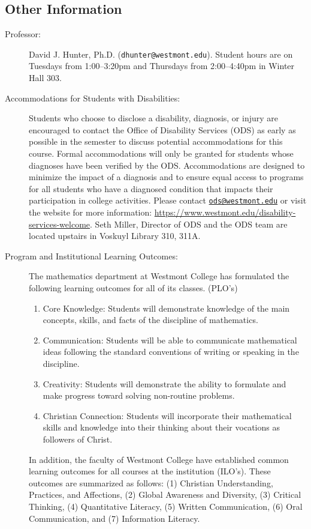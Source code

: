 \documentclass[
  twoside]{article}
\begin{document}
\hypertarget{other-information}{%
\subsection{Other Information}\label{other-information}}

\begin{description} 

\item[Professor:] David J. Hunter, Ph.D.
  (\verb!dhunter@westmont.edu!). Student hours are on Tuesdays from 1:00--3:20pm and Thursdays from 2:00--4:40pm in Winter Hall 303.

\item[Accommodations for Students with Disabilities:] Students who choose to disclose a disability, diagnosis, or injury are encouraged to contact the Office of Disability Services (ODS) as early as possible in the semester to discuss potential accommodations for this course. Formal accommodations will only be granted for students whose diagnoses have been verified by the ODS. Accommodations are designed to minimize the impact of a diagnosis and to ensure equal access to programs for all students who have a diagnosed condition that impacts their participation in college activities. Please contact \href{mailto:ods@westmont.edu}{\tt ods@westmont.edu} or visit the website for more information: \url{https://www.westmont.edu/disability-services-welcome}. Seth Miller, Director of ODS and the ODS team are located upstairs in Voskuyl Library 310, 311A. 

\item[Program and Institutional Learning Outcomes:] The
         mathematics department at Westmont College has formulated the
         following learning outcomes for all of its classes. (PLO's)
\begin{enumerate}[noitemsep]
\item Core Knowledge: Students will demonstrate knowledge of the
                  main concepts, skills, and facts of the discipline of
                  mathematics.
\item Communication: Students will be able to communicate mathematical ideas
     following the standard conventions of writing or speaking in the
     discipline.
\item Creativity: Students will demonstrate the ability to formulate and make
     progress toward solving non-routine problems.
\item Christian Connection: Students will incorporate their mathematical skills
     and knowledge into their thinking about their vocations as followers of
     Christ.
         \end{enumerate}
         In addition, the faculty of Westmont College have established common
         learning outcomes for all courses at the institution
         (ILO's). These outcomes are summarized as follows:
(1) Christian Understanding, Practices, and Affections,
(2) Global Awareness and Diversity,
(3) Critical Thinking,
(4) Quantitative Literacy,
(5) Written Communication,
(6) Oral Communication, and
(7) Information Literacy.


\end{description}
\end{document}
